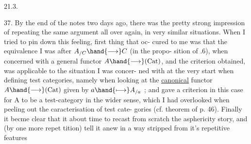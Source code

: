 21.3.

37. By the end of the notes two days ago, there was the pretty strong
impression of repeating the same argument all over again, in very similar
situations. When I tried to pin down this feeling, first thing that oc-%
cured to me was that the  equivalence I was after $A_{/C} \hand{\longrightarrow} C$ (in the propo-%
sition of .6), when concerned with a general functor $A \hand{\longrightarrow} (\mathrm{Cat})$,
and the criterion obtained, was applicable to the situation I was concer-%
ned with at the very start when defining test categories, namely when
looking at the \uline{canonical} functor $A \hand{\longrightarrow} (\mathrm{Cat})$ given by $a \hand{\longmapsto} A_{/a}$ ; and  gave
a criterion in this case for A to be a test-category in the wider sense,
which I had overlooked when peeling out the caracterisation of test cate-%
gories (cf. theorem of p. 46). Finally it becme clear that it  about
time to recast from scratch the asphericity story, and (by one more repet%
tition) tell it anew in a way stripped from it's repetitive features
